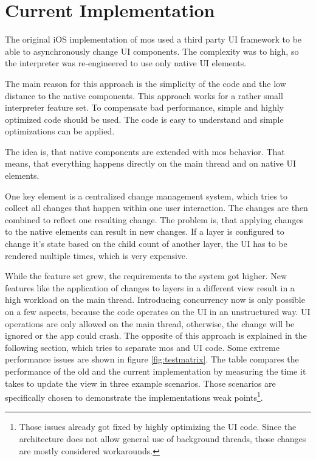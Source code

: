 \section{Current Implementation}
\label{sec:nativeapproach}

The original iOS implementation of mos used a third party \ac{UI} framework to be able to asynchronously change \ac{UI} components.
The complexity was to high, so the interpreter was re-engineered to use only native \ac{UI} elements.

The main reason for this approach is the simplicity of the code and the low distance to the native components.
This approach works for a rather small interpreter feature set.
To compensate bad performance, simple and highly optimized code should be used.
The code is easy to understand and simple optimizations can be applied.

The idea is, that native components are extended with mos behavior.
That means, that everything happens directly on the main thread and on native \ac{UI} elements.

One key element is a centralized change management system, which tries to collect all changes that happen within one user interaction.
The changes are then combined to reflect one resulting change.
The problem is, that applying changes to the native elements can result in new changes.
If a layer is configured to change it's state based on the child count of another layer, the \ac{UI} has to be rendered multiple times, which is very expensive.

While the feature set grew, the requirements to the system got higher.
New features like the application of changes to layers in a different view result in a high workload on the main thread.
Introducing concurrency now is only possible on a few aspects, because the code operates on the \ac{UI} in an unstructured way.
\ac{UI} operations are only allowed on the main thread, otherwise, the change will be ignored or the app could crash.
The opposite of this approach is explained in the following section, which tries to separate \ac{mos} and \ac{UI} code.
Some extreme performance issues are shown in figure \ref{fig:testmatrix}.
The table compares the performance of the old and the current implementation by measuring the time it takes to update the view in three example scenarios.
Those scenarios are specifically chosen to demonstrate the implementations weak points\footnote{Those issues already got fixed by highly optimizing the \ac{UI} code. Since the architecture does not allow general use of background threads, those changes are mostly considered workarounds.}.

